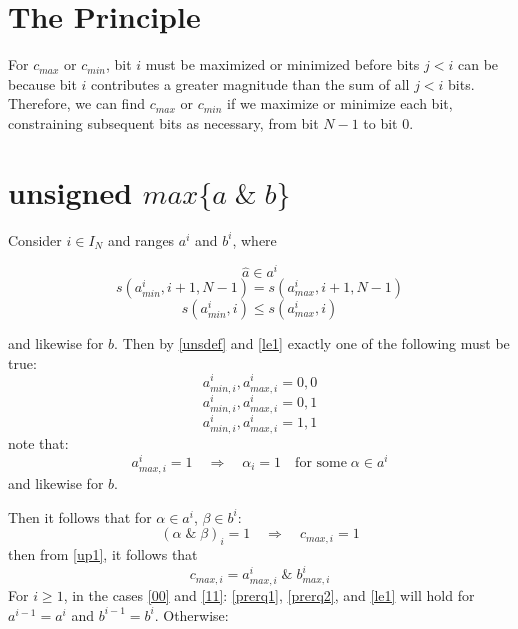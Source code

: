 \documentclass{article}
\begin{document}
\section{The Principle}

For $c_{max}$ or $c_{min}$, bit $i$ must be maximized or 
minimized before bits $j<i$ can be because bit $i$ contributes a greater 
magnitude than the sum of all $j<i$ bits. Therefore, we can find $c_{max}$ 
or $c_{min}$ if we maximize or minimize each bit, constraining subsequent 
bits as necessary, from bit $N-1$ to bit $0$.

\section{unsigned $max \{a\;\&\;b\}$}\label{maxand}
Consider $i \in I_N$ and ranges $a^i$ and $b^i$, where

\begin{equation}\label{prerq1} \hat a \in a^i \end{equation}
\begin{equation}\label{prerq2} 
s(a^i_{min},i+1,N-1) = s(a^i_{max},i+1,N-1)
\end{equation}
\begin{equation}\label{le1} s(a^i_{min},i) \le s(a^i_{max},i)\end{equation}

and likewise for $b$. Then by \eqref{unsdef} and \eqref{le1} exactly one of the following must be true:
\begin{equation}\label{00} 
a^i_{min,i},a^i_{max,i} = 0,0
\end{equation}
\begin{equation}\label{01} 
a^i_{min,i},a^i_{max,i} = 0,1
\end{equation}
\begin{equation}\label{11} 
a^i_{min,i}, a^i_{max,i} = 1,1
\end{equation}
note that:
\begin{equation}\label{up1}
a^i_{max, i} = 1 \quad \Rightarrow \quad \alpha_i = 1 \quad 
\text{for some} \; \alpha \in a^i
\end{equation}
and likewise for $b$.

Then it follows that for $\alpha \in a^i$, 
$\beta \in b^i$:
\begin{equation}
(\alpha \; \text{\&} \; \beta)_i = 1
\quad \Rightarrow \quad c_{max,i} = 1
\end{equation}
then from \eqref{up1}, it follows that 
\begin{equation}
c_{max,i} = a^i_{max,i} \; \text{\&}\; b^i_{max,i}
\end{equation}
For $i \ge 1$, in the cases \eqref{00} and \eqref{11}: \eqref{prerq1}, 
\eqref{prerq2}, and \eqref{le1} will hold for $a^{i-1}=a^i$ and 
$b^{i-1} = b^i$. Otherwise:
\end{document}
